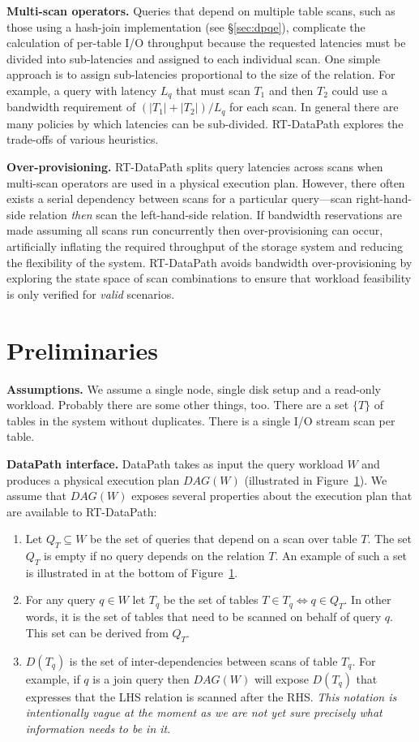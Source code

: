 \documentclass{sig-alternate}
\begin{document}
{\bf Multi-scan operators.} Queries that depend on multiple table scans, such
as those using a hash-join implementation (see \S\ref{sec:dpqe}), complicate
the calculation of per-table I/O throughput because the requested latencies
must be divided into sub-latencies and assigned to each individual scan. One
simple approach is to assign sub-latencies proportional to the size of the
relation. For example, a query with latency $L_q$ that must scan $T_1$ and
then $T_2$ could use a bandwidth requirement of $(|T_1| + |T_2|)/L_q$ for each
scan. In general there are many policies by which latencies can be
sub-divided. RT-DataPath explores the trade-offs of various heuristics.

{\bf Over-provisioning.} RT-DataPath splits query latencies across scans when
multi-scan operators are used in a physical execution plan.  However, there
often exists a serial dependency between scans for a particular query---scan
right-hand-side relation \emph{then} scan the left-hand-side relation. If
bandwidth reservations are made assuming all scans run concurrently then
over-provisioning can occur, artificially inflating the required throughput of
the storage system and reducing the flexibility of the system.  RT-DataPath
avoids bandwidth over-provisioning by exploring the state space of scan
combinations to ensure that workload feasibility is only verified for
\emph{valid} scenarios.

\section{Preliminaries}

{\bf Assumptions.} We assume a single node, single disk setup and a read-only
workload. Probably there are some other things, too. There are a set $\{T\}$
of tables in the system without duplicates. There is a single I/O stream scan
per table.

{\bf DataPath interface.} DataPath takes as input the query workload $W$ and
produces a physical execution plan $DAG(W)$ (illustrated in Figure~\ref{}). We
assume that $DAG(W)$ exposes several properties about the execution plan that
are available to RT-DataPath:

\begin{enumerate}
\item Let $Q_T \subseteq W$ be the set of queries that depend on a scan over
	table $T$. The set $Q_T$ is empty if no query depends on the relation $T$.
	An example of such a set is illustrated in at the bottom of Figure~\ref{}.
\item For any query $q \in W$ let $T_q$ be the set of tables $T \in T_q \iff q
	\in Q_T$. In other words, it is the set of tables that need to be scanned
	on behalf of query $q$. This set can be derived from $Q_T$.
\item $D(T_q)$ is the set of inter-dependencies between scans of table $T_q$.
	For example, if $q$ is a join query then $DAG(W)$ will expose $D(T_q)$
	that expresses that the LHS relation is scanned after the RHS.  \emph{This
		notation is intentionally vague at the moment as we are not yet sure
	precisely what information needs to be in it}.
\end{enumerate}
\end{document}
